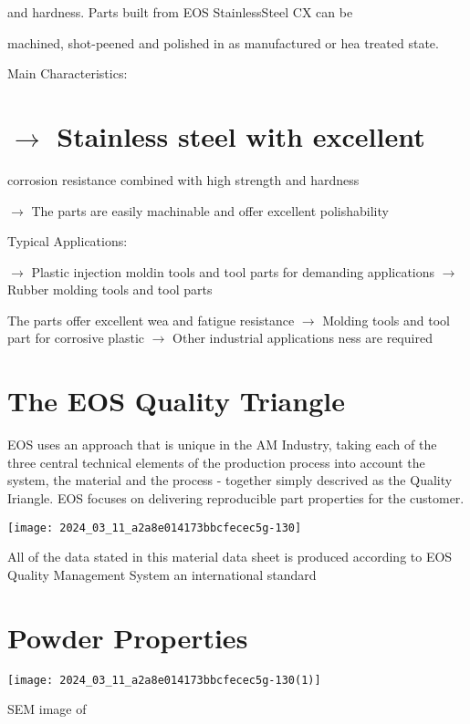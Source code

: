 \documentclass[10pt]{article}
\begin{document}
and hardness. Parts built from EOS StainlessSteel CX can be

machined, shot-peened and polished in as manufactured or hea treated state.

Main Characteristics:

\section*{$\longrightarrow$ Stainless steel with excellent}
corrosion resistance combined with high strength and hardness

$\longrightarrow$ The parts are easily machinable and offer excellent polishability

Typical Applications:

$\longrightarrow$ Plastic injection moldin tools and tool parts for demanding applications $\longrightarrow$ Rubber molding tools and tool parts

The parts offer excellent wea and fatigue resistance $\longrightarrow$ Molding tools and tool part for corrosive plastic $\longrightarrow$ Other industrial applications ness are required

\section*{The EOS Quality Triangle}
EOS uses an approach that is unique in the AM Industry, taking each of the three central technical elements of the production process into account the system, the material and the process - together simply descrived as the Quality Iriangle. EOS focuses on delivering reproducible part properties for the customer.

\begin{center}
\texttt{[image: 2024\_03\_11\_a2a8e014173bbcfecec5g-130]}
\end{center}

All of the data stated in this material data sheet is produced according to EOS Quality Management System an international standard

\section*{Powder Properties}
\begin{center}
\texttt{[image: 2024\_03\_11\_a2a8e014173bbcfecec5g-130(1)]}
\end{center}

SEM image of
\end{document}
